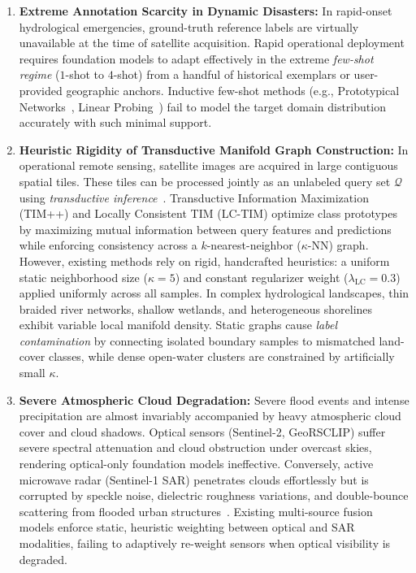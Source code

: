 \begin{enumerate}
    \item \textbf{Extreme Annotation Scarcity in Dynamic Disasters:} In rapid-onset hydrological emergencies, ground-truth reference labels are virtually unavailable at the time of satellite acquisition. Rapid operational deployment requires foundation models to adapt effectively in the extreme \emph{few-shot regime} ($1$-shot to $4$-shot) from a handful of historical exemplars or user-provided geographic anchors. Inductive few-shot methods (e.g., Prototypical Networks~\cite{snell2017prototypical}, Linear Probing~\cite{huang2024lpplusplus}) fail to model the target domain distribution accurately with such minimal support.
    \item \textbf{Heuristic Rigidity of Transductive Manifold Graph Construction:} In operational remote sensing, satellite images are acquired in large contiguous spatial tiles. These tiles can be processed jointly as an unlabeled query set $\mathcal{Q}$ using \emph{transductive inference}~\cite{boudriki2020transductive,li2026timplusplus,elkhoury2026lctim}. Transductive Information Maximization (TIM++) and Locally Consistent TIM (LC-TIM) optimize class prototypes by maximizing mutual information between query features and predictions while enforcing consistency across a $k$-nearest-neighbor ($\kappa$-NN) graph. However, existing methods rely on rigid, handcrafted heuristics: a uniform static neighborhood size ($\kappa=5$) and constant regularizer weight ($\lambda_{\text{LC}}=0.3$) applied uniformly across all samples. In complex hydrological landscapes, thin braided river networks, shallow wetlands, and heterogeneous shorelines exhibit variable local manifold density. Static graphs cause \emph{label contamination} by connecting isolated boundary samples to mismatched land-cover classes, while dense open-water clusters are constrained by artificially small $\kappa$.
    \item \textbf{Severe Atmospheric Cloud Degradation:} Severe flood events and intense precipitation are almost invariably accompanied by heavy atmospheric cloud cover and cloud shadows. Optical sensors (Sentinel-2, GeoRSCLIP) suffer severe spectral attenuation and cloud obstruction under overcast skies, rendering optical-only foundation models ineffective. Conversely, active microwave radar (Sentinel-1 SAR) penetrates clouds effortlessly but is corrupted by speckle noise, dielectric roughness variations, and double-bounce scattering from flooded urban structures~\cite{clement2018multi}. Existing multi-source fusion models enforce static, heuristic weighting between optical and SAR modalities, failing to adaptively re-weight sensors when optical visibility is degraded.
\end{enumerate}

